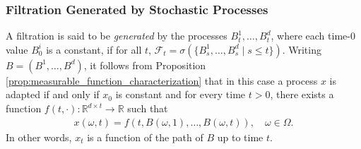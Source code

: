 \documentclass[\topdir/lecture\_notes.tex]{subfiles}
\begin{document}
\subsubsection{Filtration Generated by Stochastic Processes}
A filtration is said to be \emph{generated} by the processes $B_t^{1}, \ldots, B_t^{d}$,
where each time-$0$ value $B_{0}^{i}$ is a constant, if for all $t$, $ \mathcal{F}_{t}=\sigma(\{B_{s}^{1}, \ldots, B_{s}^{d} \mid s \leq t\})$. Writing $B=(B^{1}, \ldots, B^{d})$, it follows from Proposition \ref{prop:measurable_function_characterization} that in this case a process $x$ is adapted if and only if $x_{0}$ is constant and for every time $t>0$, there exists a function $f(t, \cdot): \mathbb{R}^{d \times t} \rightarrow \mathbb{R}$ such that
\begin{align*}
x(\omega, t)=f(t, B(\omega, 1), \ldots, B(\omega, t)), \quad \omega \in \Omega .
\end{align*}
In other words, $x_{t}$ is a function of the path of $B$ up to time $t$.
\end{document}
